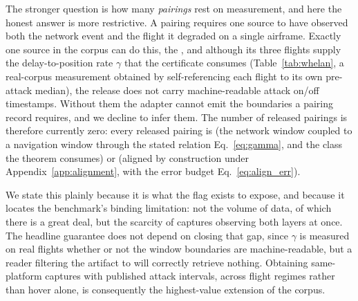 The stronger question is how many \emph{pairings} rest on measurement, and here
the honest answer is more restrictive. A  pairing
requires one source to have observed both the network event and the flight it
degraded on a single airframe. Exactly one source in the corpus can do this, the
, and although its three flights supply the
delay-to-position rate $\gamma$ that the certificate consumes
(Table~\ref{tab:whelan}, a real-corpus measurement obtained by
self-referencing each flight to its own pre-attack median), the release does not
carry machine-readable attack on/off timestamps. Without them the adapter cannot
emit the  boundaries a pairing record requires, and we decline
to infer them. The number of released 
pairings is therefore currently zero: every released pairing is
 (the network window coupled to a navigation window through
the stated relation Eq.~\eqref{eq:gamma}, and the class the theorem consumes) or
 (aligned by construction under
Appendix~\ref{app:alignment}, with the error budget Eq.~\eqref{eq:align_err}).

We state this plainly because it is what the flag exists to expose, and because
it locates the benchmark's binding limitation: not the volume of data, of which
there is a great deal, but the scarcity of captures observing both layers at
once. The headline guarantee does not depend on closing that gap, since $\gamma$
is measured on real flights whether or not the window boundaries are
machine-readable, but a reader filtering the artifact to
 will correctly retrieve nothing. Obtaining
same-platform captures with published attack intervals, across flight regimes
rather than hover alone, is consequently the highest-value extension of the
corpus.

\begin{table}[t]
\centering
\caption{Acquisition provenance across the ingested corpus. Counts are from the
schema-validated adapter outputs; the split is machine-generated by
 so the paper cannot drift from the
artifact. Acquisition is a property of the \emph{source}; the strictly stronger
 distribution is discussed in the text.}
\label{tab:provenance}
\small
\renewcommand{\arraystretch}{1.05}

\end{table}

